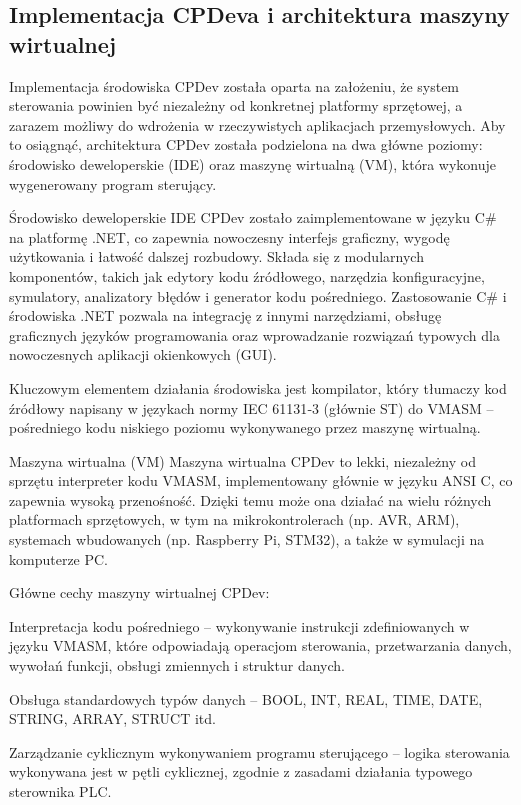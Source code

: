 \documentclass[12pt,twoside]{article}
\begin{document}
\subsection{Implementacja CPDeva i architektura maszyny wirtualnej}
Implementacja środowiska CPDev została oparta na założeniu, że system sterowania powinien być niezależny od konkretnej platformy sprzętowej, a zarazem możliwy do wdrożenia w rzeczywistych aplikacjach przemysłowych. Aby to osiągnąć, architektura CPDev została podzielona na dwa główne poziomy: środowisko deweloperskie (IDE) oraz maszynę wirtualną (VM), która wykonuje wygenerowany program sterujący.

Środowisko deweloperskie
IDE CPDev zostało zaimplementowane w języku C\# na platformę .NET, co zapewnia nowoczesny interfejs graficzny, wygodę użytkowania i łatwość dalszej rozbudowy. Składa się z modularnych komponentów, takich jak edytory kodu źródłowego, narzędzia konfiguracyjne, symulatory, analizatory błędów i generator kodu pośredniego. Zastosowanie C\# i środowiska .NET pozwala na integrację z innymi narzędziami, obsługę graficznych języków programowania oraz wprowadzanie rozwiązań typowych dla nowoczesnych aplikacji okienkowych (GUI).

Kluczowym elementem działania środowiska jest kompilator, który tłumaczy kod źródłowy napisany w językach normy IEC 61131‑3 (głównie ST) do VMASM – pośredniego kodu niskiego poziomu wykonywanego przez maszynę wirtualną.

Maszyna wirtualna (VM)
Maszyna wirtualna CPDev to lekki, niezależny od sprzętu interpreter kodu VMASM, implementowany głównie w języku ANSI C, co zapewnia wysoką przenośność. Dzięki temu może ona działać na wielu różnych platformach sprzętowych, w tym na mikrokontrolerach (np. AVR, ARM), systemach wbudowanych (np. Raspberry Pi, STM32), a także w symulacji na komputerze PC.

Główne cechy maszyny wirtualnej CPDev:

Interpretacja kodu pośredniego – wykonywanie instrukcji zdefiniowanych w języku VMASM, które odpowiadają operacjom sterowania, przetwarzania danych, wywołań funkcji, obsługi zmiennych i struktur danych.

Obsługa standardowych typów danych – BOOL, INT, REAL, TIME, DATE, STRING, ARRAY, STRUCT itd.

Zarządzanie cyklicznym wykonywaniem programu sterującego – logika sterowania wykonywana jest w pętli cyklicznej, zgodnie z zasadami działania typowego sterownika PLC.
\end{document}
